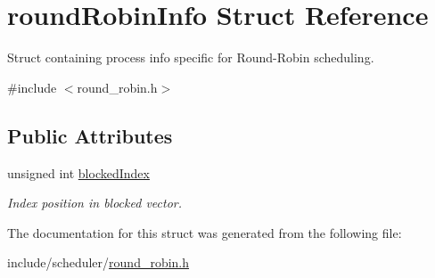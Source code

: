 \hypertarget{structroundRobinInfo}{\section{round\-Robin\-Info \-Struct \-Reference}
\label{d2/de3/structroundRobinInfo}
}


\-Struct containing process info specific for \-Round-\/\-Robin scheduling.  




{\ttfamily \#include $<$round\-\_\-robin.\-h$>$}

\subsection*{\-Public \-Attributes}
\begin{DoxyCompactItemize}
\item 
\hypertarget{structroundRobinInfo_a6c27850c4a7950e4aaa7cbcd532dca4b}{unsigned int \hyperlink{structroundRobinInfo_a6c27850c4a7950e4aaa7cbcd532dca4b}{blocked\-Index}}\label{d2/de3/structroundRobinInfo_a6c27850c4a7950e4aaa7cbcd532dca4b}

\begin{DoxyCompactList}\small\item\em \-Index position in blocked vector. \end{DoxyCompactList}\end{DoxyCompactItemize}


\-The documentation for this struct was generated from the following file\-:\begin{DoxyCompactItemize}
\item 
include/scheduler/\hyperlink{round__robin_8h}{round\-\_\-robin.\-h}\end{DoxyCompactItemize}
